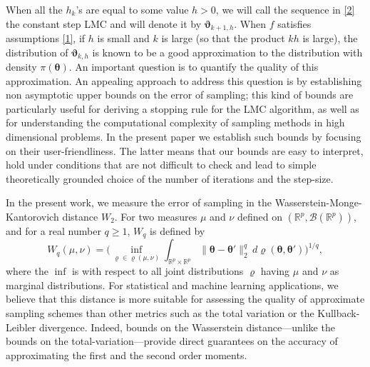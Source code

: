 \documentclass[aoap,preprint,reqno,a4paper]{imsart} %
\newcommand{\RR}{\mathbb{R}}
\newcommand{\btheta}{\boldsymbol{\theta}}
\newcommand{\bvartheta}{\boldsymbol{\vartheta}}
\begin{document}
When all the $h_k$'s are equal to some value $h>0$, we will call the sequence
in \eqref{2} the constant step LMC and will denote it by $\bvartheta_{k+1,h}$.
When $f$ satisfies assumptions \eqref{1}, if $h$ is small and $k$ is large (so that
the product $kh$ is large), the distribution of $\bvartheta_{k,h}$ is known
to be a good approximation to the distribution with density $\pi(\btheta)$. An
important question is to quantify the quality of this approximation. An appealing approach to address this question is by establishing non asymptotic upper bounds on
the error of sampling; this kind of bounds are particularly useful for deriving a stopping rule for the LMC algorithm, as well as for understanding the computational
complexity of sampling methods in high dimensional problems. In the present paper
we establish such bounds by focusing on their user-friendliness. The latter means
that our bounds are easy to interpret, hold under conditions that are not difficult
to check and lead to simple theoretically grounded choice of the number of
iterations and the step-size.

In the present work, we measure the error of sampling in the
Wasserstein-Monge-Kantorovich distance $W_2$. For two measures $\mu$ and $\nu$
defined on $(\RR^p,\mathscr B(\RR^p))$, and
for a real number $q\ge 1$, $W_q$ is defined by
\begin{equation}
W_q(\mu,\nu) = \Big(\inf_{\varrho\in \varrho(\mu,\nu)} \int_{\RR^p\times \RR^p}
		\|\btheta-\btheta'\|_2^q\,d\varrho(\btheta,\btheta')\Big)^{1/q},
\end{equation}
where the $\inf$ is with respect to all joint distributions $\varrho$ having $\mu$ and
$\nu$ as marginal distributions. For statistical and machine learning applications,
we believe that this distance is more suitable for assessing the quality of approximate
sampling schemes than other metrics such as the total variation or the Kullback-Leibler
divergence. Indeed, bounds on the Wasserstein distance---unlike the
bounds on the total-variation---provide direct guarantees on the accuracy of approximating the first and the second order moments.
\end{document}
